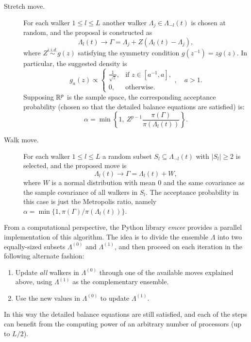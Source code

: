 \begin{description}
  \item[Stretch move.] For each walker \(1\leq l \leq L\) another walker \(\Lambda_j \in \Lambda_{-l}(t)\) is chosen at random, and the proposal is constructed as
  \[
    \Lambda_l(t) \to \Gamma = \Lambda_j + Z(\Lambda_l(t) - \Lambda_j),
  \]
  where \(Z \stackrel{i.i.d.}{\sim} g(z)\) satisfying the symmetry condition \(g(z^{-1})=zg(z)\). In particular, the suggested density is
  \[
    g_a(z) \propto \begin{cases}
      \frac{1}{\sqrt{z}}, & \text{if } z \in [a^{-1}, a], \\
      0,                  & \text{otherwise.}
    \end{cases}, \quad a > 1.
  \]
  Supposing \(\mathbb{R}^p\) is the sample space, the corresponding acceptance probability (chosen so that the detailed balance equations are satisfied) is:
  \[
    \alpha = \min\left\{1, \ Z^{p-1}\frac{\pi(\Gamma)}{\pi(\Lambda_l(t))}\right\}.
  \]

  \item[Walk move.] For each walker \(1\leq l \leq L\) a random subset \(S_l \subseteq \Lambda_{-l}(t)\) with \(|S_l| \geq 2\) is selected, and the proposed move is
  \[
    \Lambda_l(t) \to \Gamma = \Lambda_l(t) + W,
  \]
  where \(W\) is a normal distribution with mean \(0\) and the same covariance as the sample covariance of all walkers in \(S_l\). The acceptance probability in this case is just the Metropolis ratio, namely \(\alpha=\min\{1, \pi(\Gamma)/\pi(\Lambda_l(t))\}\).
\end{description}

From a computational perspective, the Python library \textit{emcee} \citep{foreman2013emcee}  provides a parallel implementation of this algorithm. The idea is to divide the ensemble \(\Lambda\) into two equally-sized subsets \(\Lambda^{(0)}\) and \(\Lambda^{(1)}\), and then proceed on each iteration in the following alternate fashion:
\begin{enumerate}
  \item Update \textit{all} walkers in \(\Lambda^{(0)}\) through one of the available moves explained above, using \(\Lambda^{(1)}\) as the complementary ensemble.
  \item Use the new values in \(\Lambda^{(0)}\) to update \(\Lambda^{(1)}\).
\end{enumerate}
In this way the detailed balance equations are still satisfied, and each of the steps can benefit from the computing power of an arbitrary number of processors (up to \(L/2\)).  

